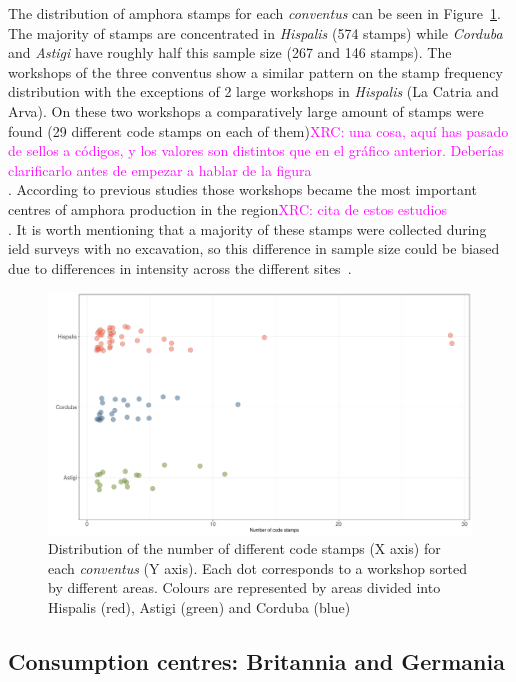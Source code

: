 \documentclass[review]{elsarticle}
\newcommand{\memo}[2]{\textcolor{#1}{#2}}
\newcommand{\xavi}[1]{\memo{magenta}{XRC: #1\\}}
\begin{document}
The distribution of amphora stamps for each \textit{conventus} can be seen in Figure~\ref{frequency}. The majority of stamps are concentrated in \textit{Hispalis} (574 stamps) while \textit{Corduba} and \textit{Astigi} have roughly half this sample size (267 and 146 stamps). The workshops of the three conventus show a similar pattern on the stamp frequency distribution with the exceptions of 2 large workshops in \textit{Hispalis} (La Catria and Arva). On these two workshops a comparatively large amount of stamps were found (29 different code stamps on each of them)\xavi{una cosa, aquí has pasado de sellos a códigos, y los valores son distintos que en el gráfico anterior. Deberías clarificarlo antes de empezar a hablar de la figura}. According to previous studies those workshops became the most important centres of amphora production in the region\xavi{cita de estos estudios}. It is worth mentioning that a majority of these stamps were collected during ield surveys with no excavation, so this difference in sample size could be biased due to differences in intensity across the different sites~\citep{arva_1997}.
 
\begin{figure}[htp]
	\centering
\includegraphics[width=\linewidth]{figs/frequency}
\caption{Distribution of the number of different code stamps (X axis) for each \textit{conventus} (Y axis). Each dot corresponds to a workshop sorted by different areas. Colours are represented by areas divided into Hispalis (red), Astigi (green) and Corduba (blue)}
\label{frequency}
\end{figure} 



\subsection{Consumption centres: Britannia and Germania}
\end{document}
